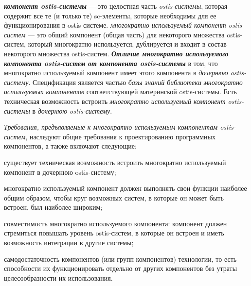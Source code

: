 \begin{SCn}
\end{SCn}

\textbf{\textit{компонент ostis-системы}} --- это целостная часть \textit{ostis-системы}, которая содержит все те (и только те) sc-элементы, которые необходимы для ее функционирования в ostis-системе. \textit{многократно используемый компонент ostis-систем} --- это общий компонент (общая часть) для некоторого множества ostis-систем, который многократно используется, дублируется и входит в состав некоторого множества ostis-систем.
\textbf{\textit{Отличие многократно используемого компонента ostis-систем от компонента ostis-системы}} в том, что многократно используемый компонент имеет  этого компонента в \textit{дочернюю ostis-систему}. Спецификация является частью \textit{базы знаний библиотеки многократно используемых компонентов} соответствующей материнской ostis-системы. Есть техническая возможность встроить \textit{многократно используемый компонент ostis-системы} в \textit{дочернюю ostis-систему}.

\textit{Требования, предъявляемые к многократно используемым компонентам ostis-систем}, наследуют общие требования к проектированию программных компонентов, а также включают следующие:
\begin{textitemize}
	\item существует техническая возможность встроить многократно используемый компонент в дочернюю ostis-систему;
	\item многократно используемый компонент должен выполнять свои функции наиболее общим образом, чтобы круг возможных систем, в которые он может быть встроен, был наиболее широким;
	\item совместимость многократно используемого компонента: компонент должен стремиться повышать уровень  ostis-систем, в которые он встроен и иметь возможность  интеграции в другие системы;
	\item самодостаточность компонентов (или групп компонентов) технологии, то есть способности их функционировать отдельно от других компонентов без утраты целесообразности их использования.
\end{textitemize}

